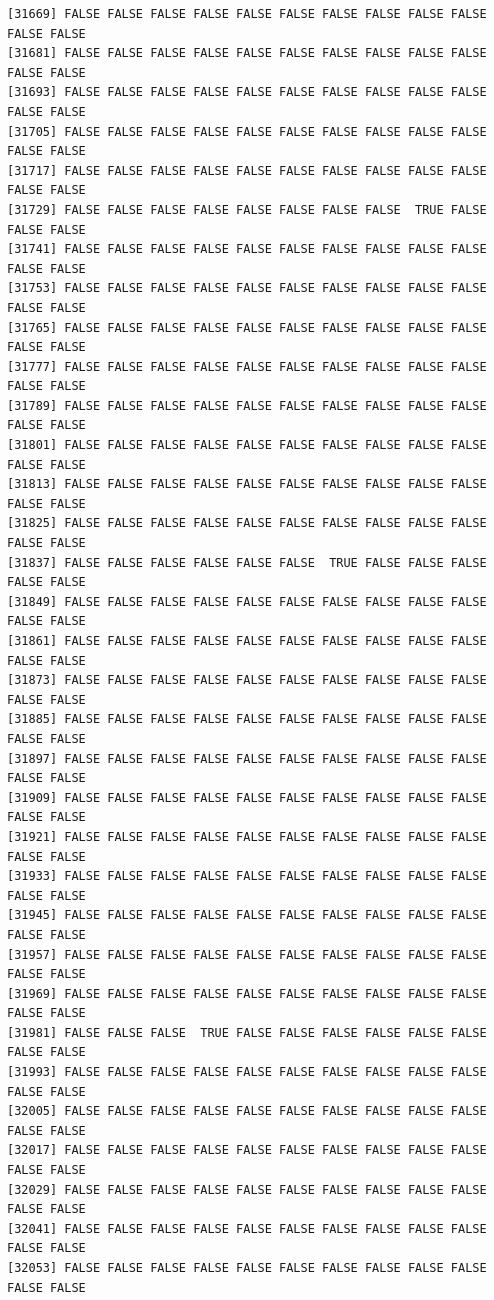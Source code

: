 \documentclass[
  a4paper,
  DIV=11,
  numbers=noendperiod]{scrartcl}
\begin{document}
\begin{verbatim}
[31669] FALSE FALSE FALSE FALSE FALSE FALSE FALSE FALSE FALSE FALSE FALSE FALSE
[31681] FALSE FALSE FALSE FALSE FALSE FALSE FALSE FALSE FALSE FALSE FALSE FALSE
[31693] FALSE FALSE FALSE FALSE FALSE FALSE FALSE FALSE FALSE FALSE FALSE FALSE
[31705] FALSE FALSE FALSE FALSE FALSE FALSE FALSE FALSE FALSE FALSE FALSE FALSE
[31717] FALSE FALSE FALSE FALSE FALSE FALSE FALSE FALSE FALSE FALSE FALSE FALSE
[31729] FALSE FALSE FALSE FALSE FALSE FALSE FALSE FALSE  TRUE FALSE FALSE FALSE
[31741] FALSE FALSE FALSE FALSE FALSE FALSE FALSE FALSE FALSE FALSE FALSE FALSE
[31753] FALSE FALSE FALSE FALSE FALSE FALSE FALSE FALSE FALSE FALSE FALSE FALSE
[31765] FALSE FALSE FALSE FALSE FALSE FALSE FALSE FALSE FALSE FALSE FALSE FALSE
[31777] FALSE FALSE FALSE FALSE FALSE FALSE FALSE FALSE FALSE FALSE FALSE FALSE
[31789] FALSE FALSE FALSE FALSE FALSE FALSE FALSE FALSE FALSE FALSE FALSE FALSE
[31801] FALSE FALSE FALSE FALSE FALSE FALSE FALSE FALSE FALSE FALSE FALSE FALSE
[31813] FALSE FALSE FALSE FALSE FALSE FALSE FALSE FALSE FALSE FALSE FALSE FALSE
[31825] FALSE FALSE FALSE FALSE FALSE FALSE FALSE FALSE FALSE FALSE FALSE FALSE
[31837] FALSE FALSE FALSE FALSE FALSE FALSE  TRUE FALSE FALSE FALSE FALSE FALSE
[31849] FALSE FALSE FALSE FALSE FALSE FALSE FALSE FALSE FALSE FALSE FALSE FALSE
[31861] FALSE FALSE FALSE FALSE FALSE FALSE FALSE FALSE FALSE FALSE FALSE FALSE
[31873] FALSE FALSE FALSE FALSE FALSE FALSE FALSE FALSE FALSE FALSE FALSE FALSE
[31885] FALSE FALSE FALSE FALSE FALSE FALSE FALSE FALSE FALSE FALSE FALSE FALSE
[31897] FALSE FALSE FALSE FALSE FALSE FALSE FALSE FALSE FALSE FALSE FALSE FALSE
[31909] FALSE FALSE FALSE FALSE FALSE FALSE FALSE FALSE FALSE FALSE FALSE FALSE
[31921] FALSE FALSE FALSE FALSE FALSE FALSE FALSE FALSE FALSE FALSE FALSE FALSE
[31933] FALSE FALSE FALSE FALSE FALSE FALSE FALSE FALSE FALSE FALSE FALSE FALSE
[31945] FALSE FALSE FALSE FALSE FALSE FALSE FALSE FALSE FALSE FALSE FALSE FALSE
[31957] FALSE FALSE FALSE FALSE FALSE FALSE FALSE FALSE FALSE FALSE FALSE FALSE
[31969] FALSE FALSE FALSE FALSE FALSE FALSE FALSE FALSE FALSE FALSE FALSE FALSE
[31981] FALSE FALSE FALSE  TRUE FALSE FALSE FALSE FALSE FALSE FALSE FALSE FALSE
[31993] FALSE FALSE FALSE FALSE FALSE FALSE FALSE FALSE FALSE FALSE FALSE FALSE
[32005] FALSE FALSE FALSE FALSE FALSE FALSE FALSE FALSE FALSE FALSE FALSE FALSE
[32017] FALSE FALSE FALSE FALSE FALSE FALSE FALSE FALSE FALSE FALSE FALSE FALSE
[32029] FALSE FALSE FALSE FALSE FALSE FALSE FALSE FALSE FALSE FALSE FALSE FALSE
[32041] FALSE FALSE FALSE FALSE FALSE FALSE FALSE FALSE FALSE FALSE FALSE FALSE
[32053] FALSE FALSE FALSE FALSE FALSE FALSE FALSE FALSE FALSE FALSE FALSE FALSE

\end{verbatim}
\end{document}
